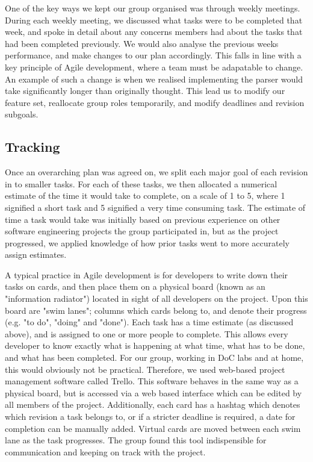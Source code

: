 \documentclass[a4paper, 11pt]{article}
\begin{document}
    One of the key ways we kept our group organised was through weekly
    meetings.  During each weekly meeting, we discussed what tasks were to be
    completed that week, and spoke in detail about any concerns members had
    about the tasks that had been completed previously. We would also analyse
    the previous weeks performance, and make changes to our plan accordingly.
    This falls in line with a key principle of Agile development, where a team
    must be adapatable to change. An example of such a change is when we
    realised implementing the parser would take significantly longer than
    originally thought. This lead us to modify our feature set, reallocate
    group roles temporarily, and modify deadlines and revision subgoals.

  \subsection{Tracking}
    Once an overarching plan was agreed on, we split each major goal of each
    revision in to smaller tasks. For each of these tasks, we then allocated a
    numerical estimate of the time it would take to complete, on a scale of 1
    to 5, where 1 signified a short task and 5 signified a very time consuming
    task. The estimate of time a task would take was initially based on
    previous experience on other software engineering projects the group
    participated in, but as the project progressed, we applied knowledge of how
    prior tasks went to more accurately assign estimates.

    A typical practice in Agile development is for developers to write down
    their tasks on cards, and then place them on a physical board (known as an
    "information radiator") located in sight of all developers on the project.
    Upon this board are "swim lanes"; columns which cards belong to, and denote
    their progress (e.g. "to do", "doing" and "done"). Each task has a time
    estimate (as discussed above), and is assigned to one or more people to
    complete.  This allows every developer to know exactly what is happening at
    what time, what has to be done, and what has been completed. For our group,
    working in DoC labs and at home, this would obviously not be practical.
    Therefore, we used web-based project management software called
    Trello. This software behaves in the same way as a physical board, but is
    accessed via a web based interface which can be edited by all members of
    the project.  Additionally, each card has a hashtag which denotes which
    revision a task belongs to, or if a stricter deadline is required, a date
    for completion can be manually added.  Virtual cards are moved between each
    swim lane as the task progresses. The group found this tool indispensible
    for communication and keeping on track with the project.
\end{document}
